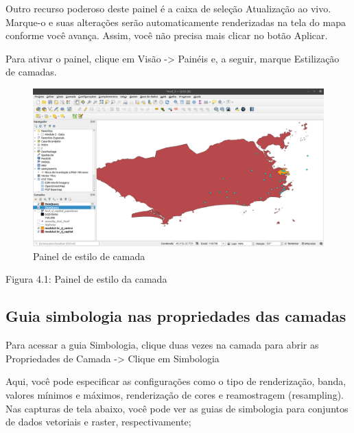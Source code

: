\documentclass[
]{krantz}
\begin{document}
Outro recurso poderoso deste painel é a caixa de seleção Atualização ao vivo. Marque-o e suas alterações serão automaticamente renderizadas na tela do mapa conforme você avança. Assim, você não precisa mais clicar no botão Aplicar.

Para ativar o painel, clique em Visão -\textgreater{} Painéis e, a seguir, marque Estilização de camadas.

\begin{figure}
\centering
\includegraphics{media/modulo4/layer-styling.png}
\caption{Painel de estilo de camada}
\end{figure}

Figura 4.1: Painel de estilo da camada

\hypertarget{guia-simbologia-nas-propriedades-das-camadas}{%
\subsection{Guia simbologia nas propriedades das camadas}\label{guia-simbologia-nas-propriedades-das-camadas}}

Para acessar a guia Simbologia, clique duas vezes na camada para abrir as Propriedades de Camada -\textgreater{} Clique em Simbologia

Aqui, você pode especificar as configurações como o tipo de renderização, banda, valores mínimos e máximos, renderização de cores e reamostragem (resampling). Nas capturas de tela abaixo, você pode ver as guias de simbologia para conjuntos de dados vetoriais e raster, respectivamente;
\end{document}
